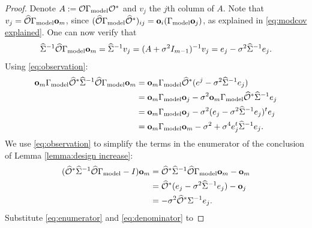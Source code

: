 \documentclass{amsart}
\numberwithin{equation}{section}
\providecommand{\DIFaddbegin}{} %
\providecommand{\DIFdelend}{} %
\begin{document}
\DIFdelend \DIFaddbegin \samemeas
\begin{proof} \label{cor:same meas proof}
  Denote $A:= \mathcal{O} \Gamma_{\textup{model}} \mathcal{O}^*$ and $v_j$ the $j$th column of $A$.
  Note that $v_j = \widehat{\mathcal{O}} \Gamma_{\textup{model}} \mathbf{o}_m$, since $(\widehat{\mathcal{O}} \Gamma_{\textup{model}}
  \widehat{\mathcal{O}}^*)_{ij} = \mathbf{o}_i(\Gamma_{\textup{model}} \mathbf{o}_j)$, as explained in
  \eqref{eq:modcov explained}. One can now verify that
  \begin{equation}\label{eq:observation}
    \widehat{\Sigma}^{-1} \widehat{\mathcal{O}} \Gamma_{\textup{model}} \mathbf{o}_m = \widehat{\Sigma}^{-1}v_j = (A +\sigma^2I_{m-1})^{-1} v_j =
    e_j -\sigma^2 \widehat{\Sigma}^{-1}e_j.
  \end{equation}
  Using \eqref{eq:observation}:
  \begin{align}\label{eq:denominator}
    \begin{split}
      \mathbf{o}_m \Gamma_{\textup{model}} \widehat{\mathcal{O}}^* \widehat{\Sigma}^{-1} \widehat{\mathcal{O}} \Gamma_{\textup{model}} \mathbf{o}_m
      &= \mathbf{o}_m \Gamma_{\textup{model}} \widehat{\mathcal{O}}^* ( e^j - \sigma^2 \widehat{\Sigma}^{-1} e_j )\\
      &= \mathbf{o}_m \Gamma_{\textup{model}} \mathbf{o}_j - \sigma^2 \mathbf{o}_m \Gamma_{\textup{model}} \widehat{\mathcal{O}}^* \widehat{\Sigma}^{-1}e_j \\
      &= \mathbf{o}_m \Gamma_{\textup{model}} \mathbf{o}_j -\sigma^2 (e_j - \sigma^2 \widehat{\Sigma}^{-1}e_j)^t e_j \\
      &= \mathbf{o}_m \Gamma_{\textup{model}} \mathbf{o}_m -\sigma^2 + \sigma^4 e_j^t\widehat{\Sigma}^{-1}e_j.
    \end{split}
  \end{align}
  We use \eqref{eq:observation} to simplify the terms in the enumerator of
  the conclusion of Lemma \ref{lemma:design increase}:
  \begin{align}\label{eq:enumerator}
    \begin{split}
      (\widehat{\mathcal{O}}^* \widehat{\Sigma}^{-1} \widehat{\mathcal{O}} \Gamma_{\textup{model}} - I ) \mathbf{o}_m
      &= \widehat{\mathcal{O}}^* \widehat{\Sigma}^{-1} \widehat{\mathcal{O}} \Gamma_{\textup{model}} \mathbf{o}_m - \mathbf{o}_m \\
      &= \widehat{\mathcal{O}}^* (e_j - \sigma^2 \widehat{\Sigma}^{-1} e_j) -\mathbf{o}_j \\ 
      &= -\sigma^2 \widehat{\mathcal{O}}^* \Sigma^{-1}e_j. 
    \end{split}
  \end{align}
  Substitute \eqref{eq:enumerator} and \eqref{eq:denominator} to

\end{proof}
\end{document}
